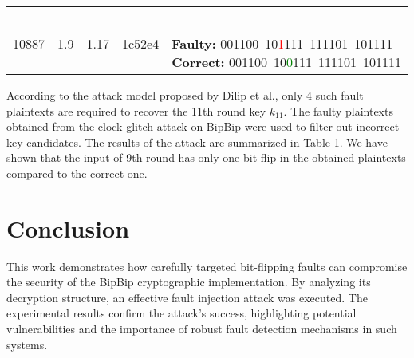 \begin{table}[h!]
\begin{tabular}{|c|c|c|c|p{5.5cm}|}
{    } \\
    \hline
    10887 & 1.9 & 1.17 & 1c52e4 & 
    \parbox{5.5cm}{
        \text{}\\
        \textbf{Faulty:} 001100\ 10\textcolor{red}{1}111\ 111101\ 101111 \\
        \textbf{Correct:} 001100\ 10\textcolor{green}{0}111\ 111101\ 101111 \\

    } \\
    \hline
    \end{tabular}
    \label{tab:glitch_summary}
    \end{table}

According to the attack model proposed by Dilip et al., only 4 such fault plaintexts are required to recover the 11th round key $k_{11}$. The faulty plaintexts obtained from the clock glitch attack on BipBip were used to filter out incorrect key candidates. The results of the attack are  summarized in Table \ref{tab:glitch_summary}. We have shown that the input of 9th round has only one bit flip in the obtained plaintexts compared to the correct one.
    
\section{Conclusion}

This work demonstrates how carefully targeted bit-flipping faults can compromise the security of the BipBip cryptographic implementation. By analyzing its decryption structure, an effective fault injection attack was executed. The experimental results confirm the attack's success, highlighting potential vulnerabilities and the importance of robust fault detection mechanisms in such systems.

